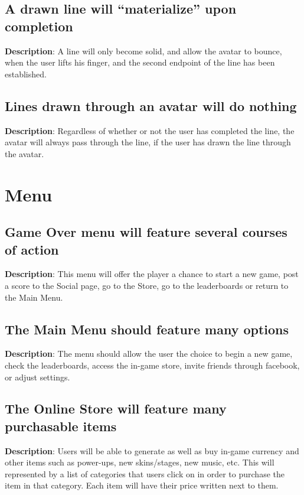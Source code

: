\subsection{A drawn line will \textquotedblleft{}materialize\textquotedblright{}
upon completion}
\textbf{Description}: A line will only become solid, and allow the
avatar to bounce, when the user lifts his finger, and the second endpoint
of the line has been established.

\subsection{Lines drawn through an avatar will do nothing}
\textbf{Description}: Regardless of whether or not the user has completed
the line, the avatar will always pass through the line, if the user
has drawn the line through the avatar.

\section{Menu}
\renewcommand\thesubsection{MENU-%
\ifnum\value{subsection}<10 0\fi
\arabic{subsection}}
\subsection{Game Over menu will feature several courses of action}
\textbf{Description}: This menu will offer the player a chance to
start a new game, post a score to the Social page, go to the Store,
go to the leaderboards or return to the Main Menu.

\subsection{The Main Menu should feature many options}
\textbf{Description}: The menu should allow the user the choice to
begin a new game, check the leaderboards, access the in-game store,
invite friends through facebook, or adjust settings.

\subsection{The Online Store will feature many purchasable items}
\textbf{Description}: Users will be able to generate as well as buy
in-game currency and other items such as power-ups, new skins/stages,
new music, etc. This will represented by a list of categories that
users click on in order to purchase the item in that category. Each
item will have their price written next to them.

